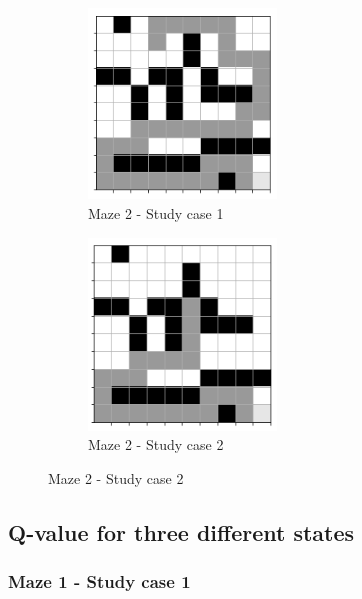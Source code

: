 \documentclass[a4paper]{article}    %
\begin{document}
\begin{figure}[H]
    \centering
    \begin{subfigure}{0.48\textwidth}
        \centering
        \includegraphics[width=5cm]{maze2-case1}
        \caption{Maze 2 - Study case 1}
        \label{fig:maze2-case1}
    \end{subfigure}
    \hfill
    \begin{subfigure}{0.48\textwidth}
        \centering
        \includegraphics[width=5cm]{maze2-case2}
        \caption{Maze 2 - Study case 2}
        \label{fig:maze2-case2}
    \end{subfigure}
\end{figure}

\subsection{Q-value for three different states}

\subsubsection{Maze 1 - Study case 1}
\end{document}

